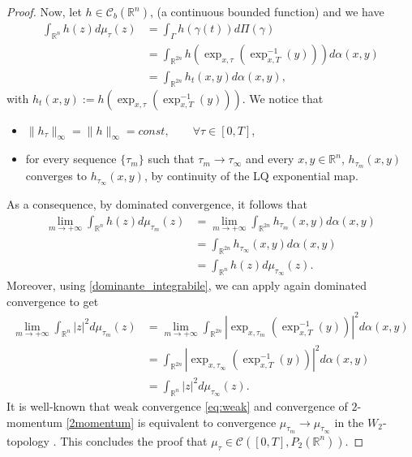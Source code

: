 \documentclass[reqno]{amsart}
\theoremstyle{plain}
\theoremstyle{definition}
\theoremstyle{remark}
\begin{document}
\begin{proof}
			Now, let $h\in\mathcal{C}_b(\mathbb{R}^n)$, (a continuous bounded function) and we have
			\begin{align}
				\int_{\mathbb{R}^n}h(z)d\mu_\tau(z)&=\int_{\Gamma}h(\gamma(t))d\Pi(\gamma)\\
					&=\int_{\mathbb{R}^{2n}}h(\exp_{x,\tau}(\exp_{x,T}^{-1}(y)))d\alpha(x,y)\\
					&=\int_{\mathbb{R}^{2n}}h_t(x,y)d\alpha(x,y),
			\end{align} 
			with $h_t(x,y):=h(\exp_{x,\tau}(\exp_{x,T}^{-1}(y)))$.
			We notice that
			\begin{itemize}
				\item $\|h_\tau\|_{\infty}=\|h\|_{\infty}=const, \qquad\forall \tau\in[0,T]$,
				\item for every sequence $\{\tau_m\}$ such that $\tau_m\to \tau_{\infty}$ and every $x,y\in\mathbb{R}^{n}$, $h_{\tau_m}(x,y)$ converges to $h_{\tau_{\infty}}(x,y)$, by continuity of the LQ exponential map.
			\end{itemize} 
			As a consequence, by dominated convergence, it follows that
			\begin{align}
				\lim\limits_{m\to+\infty}\int_{\mathbb{R}^n}h(z)d\mu_{\tau_m}(z)&=\lim\limits_{m\to+\infty}\int_{\mathbb{R}^{2n}}h_{\tau_m}(x,y)d\alpha(x,y)\\
				&=\int_{\mathbb{R}^{2n}}h_{\tau_{\infty}}(x,y)d\alpha(x,y)\\
				&=\int_{\mathbb{R}^n}h(z)d\mu_{\tau_{\infty}}(z).\label{eq:weak}
			\end{align}
			Moreover, using \eqref{dominante_integrabile}, we can apply again dominated convergence to get
			\begin{align}
		  \lim\limits_{m\to+\infty}\int_{\mathbb{R}^n}|z|^2d\mu_{\tau_m}(z)&=\lim\limits_{m\to+\infty}\int_{\mathbb{R}^{2n}}|\exp_{x,\tau_m}(\exp_{x,T}^{-1}(y))|^2d\alpha(x,y)\\
				&=\int_{\mathbb{R}^{2n}}|\exp_{x,\tau_{\infty}}(\exp_{x,T}^{-1}(y))|^2d\alpha(x,y)\\
				&=\int_{\mathbb{R}^n}|z|^2d\mu_{\tau_{\infty}}(z). \label{2momentum}
			\end{align}
            It is well-known that weak convergence \eqref{eq:weak} and convergence of $2$-momentum \eqref{2momentum} is equivalent to convergence $\mu_{\tau_m} \to \mu_{\tau_\infty}$ in the $W_2$-topology \cite[Theorem 6.9]{Villanioldandnew}. This concludes  the proof that $\mu_\tau\in\mathcal{C}([0,T],P_2(\mathbb{R}^n))$.
			

\end{proof}
\end{document}
